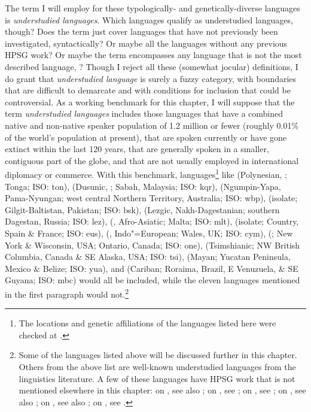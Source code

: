 \documentclass[output=paper
 	        ,biblatex
                ,babelshorthands
                ,newtxmath
                ,draftmode
                ,colorlinks, citecolor=brown
]{langscibook}
\begin{document}
\largerpage
The term I will employ for these typologically- and genetically-diverse languages is
\emph{understudied languages}. Which languages qualify as understudied languages, though? Does the
term just cover languages that have not previously been investigated, syntactically? Or maybe all
the languages without any previous HPSG work? Or maybe the term encompasses any language that is not
the most described language, ? Though I reject all these (somewhat jocular)
definitions, I do grant that \textit{understudied language} is surely a fuzzy category, with
boundaries that are difficult to demarcate and with conditions for inclusion that could be
controversial. As a working benchmark for this chapter, I will suppose that the term
\textit{understudied languages} includes those languages that have a combined native and non-native
speaker population of 1.2 million or fewer (roughly 0.01\% of the world's population at present),
that are spoken currently or have gone extinct within the last 120 years, that are generally spoken
in a smaller, contiguous part of the globe, and that are not usually employed in international
diplomacy or commerce. With this benchmark, languages\footnote{The locations and genetic
  affiliations of the languages listed here were checked at \citet{glottolog18}.} like
 (Polynesian, ; Tonga; ISO: ton), 
 (Dusunic, ; Sabah, Malaysia; ISO: kqr),
 (Ngumpin-Yapa, Pama-Nyungan; west central Northern Territory, Australia; ISO: wbp), 
 (isolate; Gilgit-Baltistan, Pakistan; ISO: bsk), 
 (Lezgic, Nakh-Dagestanian; southern Dagestan, Russia; ISO: lez), 
 (, Afro-Asiatic; Malta; ISO: mlt), 
 (isolate;  Country, Spain \& France; ISO: eus),  
 (, Indo"=European; Wales, UK; ISO: cym), 
 (; New York \& Wisconsin, USA; Ontario, Canada; ISO: one), 
 (Tsimshianic; NW British Columbia, Canada \& SE Alaska, USA; ISO: tsi),
 (Mayan; Yucatan Peninsula, Mexico \& Belize; ISO: yua), and
 (Cariban; Roraima, Brazil, E Venuzuela, \& SE Guyana; ISO: mbc)
would all be included, while the eleven languages mentioned in the first paragraph would
not.\footnote{\label{list expln}Some of the languages listed above will be discussed further in this
  chapter. Others from the above list are well-known understudied languages from the linguistics
  literature. A few of these languages have HPSG work that is not mentioned elsewhere in this
  chapter: on , see also \citet{dukes2000}; on , see \citet{donosag99}; on
  , see \citet{MuellerMalteseSketch}; 
on , see also \citet{CB11}; on , see also \citet{KM2010a-u}; on , see \citet{dabkowski17}.}   
\end{document}
